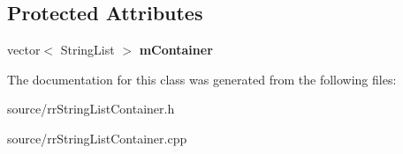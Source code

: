 \subsection*{Protected Attributes}
\begin{DoxyCompactItemize}
\item 
\hypertarget{classrr_1_1_string_list_container_a2ef3db4260313525c3ffef3dc8b3d6ce}{vector$<$ String\-List $>$ {\bfseries m\-Container}}\label{classrr_1_1_string_list_container_a2ef3db4260313525c3ffef3dc8b3d6ce}

\end{DoxyCompactItemize}


The documentation for this class was generated from the following files\-:\begin{DoxyCompactItemize}
\item 
source/rr\-String\-List\-Container.\-h\item 
source/rr\-String\-List\-Container.\-cpp\end{DoxyCompactItemize}
